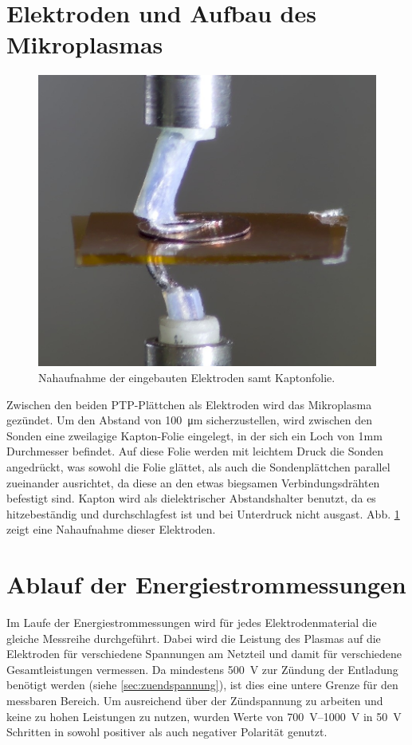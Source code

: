\section{Elektroden und Aufbau des Mikroplasmas}

\begin{figure}[h]
	\centering
	\includegraphics[width=0.7\linewidth]{bilder/plaettchenbesser.jpg}
	\caption{Nahaufnahme der eingebauten Elektroden samt Kaptonfolie.}
	\label{fig:plaettchen}
\end{figure}

Zwischen den beiden PTP-Plättchen als Elektroden wird das Mikroplasma gezündet. Um den Abstand von \qty{100}{\um} sicherzustellen, wird zwischen den Sonden eine zweilagige Kapton-Folie eingelegt, in der sich ein Loch von 1mm Durchmesser befindet. Auf diese Folie werden mit leichtem Druck die Sonden angedrückt, was sowohl die Folie glättet, als auch die Sondenplättchen parallel zueinander ausrichtet, da diese an den etwas biegsamen Verbindungsdrähten befestigt sind. Kapton wird als dielektrischer Abstandshalter benutzt, da es hitzebeständig und durchschlagfest ist und bei Unterdruck nicht ausgast. Abb. \ref{fig:plaettchen} zeigt eine Nahaufnahme dieser Elektroden.

\section{Ablauf der Energiestrommessungen}\label{sec:ablauf_energie}

Im Laufe der Energiestrommessungen wird für jedes Elektrodenmaterial die gleiche Messreihe durchgeführt. Dabei wird die Leistung des Plasmas auf die Elektroden für verschiedene Spannungen am Netzteil und damit für verschiedene Gesamtleistungen vermessen. Da mindestens \qty{500}{V} zur Zündung der Entladung benötigt werden (siehe \ref{sec:zuendspannung}), ist dies eine untere Grenze für den messbaren Bereich. Um ausreichend über der Zündspannung zu arbeiten und keine zu hohen Leistungen zu nutzen, wurden Werte von \qtyrange{700}{1000}{V} in \qty{50}{V} Schritten in sowohl positiver als auch negativer Polarität genutzt.

